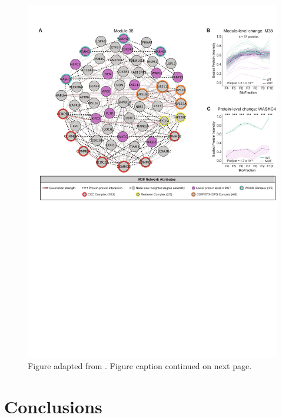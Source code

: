 \documentclass[PhD]{dukethesis}
\begin{document}
\begin{figure}[ht] 
	\begin{center}
		\includegraphics[width=0.7\paperwidth,keepaspectratio]{m38}
			\caption[This is a figure caption.]{Figure adapted from
			\cite{Courtland2021}. Figure caption continued on next page.}
		\label{fig:m38}
	\end{center}
\end{figure}

\begin{figure}[t]
		\contcaption{\lipsum[3]}
\end{figure}



\chapter{Conclusions}
\end{document}
